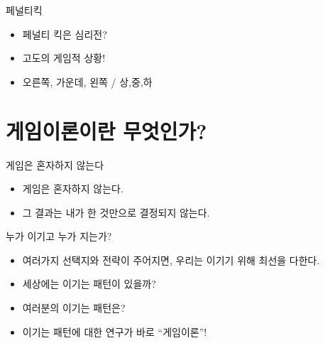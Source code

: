\documentclass[final]{beamer}
\begin{document}
\begin{frame}[t]{페널티킥}
	\begin{center}
	\end{center}
	\begin{itemize}
		\item 페널티 킥은 심리전? 
		\item 고도의 게임적 상황! 
		\item 오른쪽, 가운데, 왼쪽 / 상,중,하 
	\end{itemize}
\end{frame}


\section{게임이론이란 무엇인가?} %
\label{sec:WhatisGame}

\begin{frame}[t]{게임은 혼자하지 않는다}
	\begin{center}
	\end{center}
	\begin{itemize}
		\item 게임은 혼자하지 않는다. 
		\item 그 결과는 내가 한 것만으로 결정되지 않는다. 
	\end{itemize}
\end{frame}

\begin{frame}[t]{누가 이기고 누가 지는가?}
	\begin{itemize}
		\item 여러가지 선택지와 전략이 주어지면, 우리는 이기기 위해 최선을 다한다.  
		\item 세상에는 이기는 패턴이 있을까? 
		\item 여러분의 이기는 패턴은? 
		\item 이기는 패턴에 대한 연구가 바로 ``게임이론''!
	\end{itemize}
\end{frame}

\end{document}

